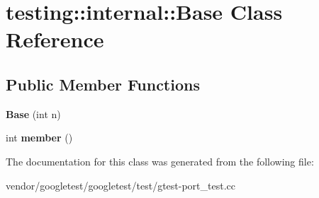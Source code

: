 \hypertarget{classtesting_1_1internal_1_1_base}{}\section{testing\+:\+:internal\+:\+:Base Class Reference}
\label{classtesting_1_1internal_1_1_base}
\subsection*{Public Member Functions}
\begin{DoxyCompactItemize}
\item 
\mbox{\label{classtesting_1_1internal_1_1_base_a255d105410a1eeb5f4690c9c8cd8e104}} 
{\bfseries Base} (int n)
\item 
\mbox{\label{classtesting_1_1internal_1_1_base_a7ddba6221b56613be545544b7ef6214c}} 
int {\bfseries member} ()
\end{DoxyCompactItemize}


The documentation for this class was generated from the following file\+:\begin{DoxyCompactItemize}
\item 
vendor/googletest/googletest/test/gtest-\/port\+\_\+test.\+cc\end{DoxyCompactItemize}
